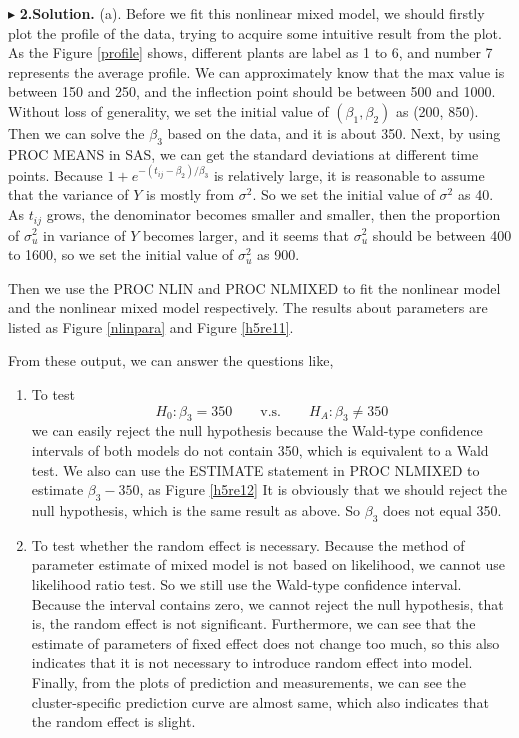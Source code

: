 \documentclass[letterpaper, 12pt]{article}
\begin{document}
$\blacktriangleright$ \textbf{2.\quad Solution.} 
(a). Before we fit this nonlinear mixed model, we should firstly plot the profile of the data, trying to acquire some intuitive result from the plot. As the Figure \ref{profile} shows, different plants are label as 1 to 6, and number 7 represents the average profile. We can approximately know that the max value is between 150 and 250, and the inflection point should be between 500 and 1000. Without loss of generality, we set the initial value of $(\beta_1,\beta_2)$ as (200, 850). Then we can solve the $\beta_3$ based on the data, and it is about 350. Next, by using PROC MEANS in SAS, we can get the standard deviations at different time points. Because $1+e^{-(t_{ij}-\beta_2)/\beta_3}$ is relatively large, it is reasonable to assume that the variance of $Y$ is mostly from $\sigma^2$. So we set the initial value of $\sigma^2$ as 40. As $t_{ij}$ grows, the denominator becomes smaller and smaller, then the proportion of $\sigma_u^2$ in variance of $Y$ becomes larger, and it seems that $\sigma_u^2$ should be between 400 to 1600, so we set the initial value of $\sigma_u^2$ as 900.


Then we use the PROC NLIN and PROC NLMIXED to fit the nonlinear model and the nonlinear mixed model respectively. The results about parameters are listed as Figure \ref{nlinpara} and Figure \ref{h5re11}.

From these output, we can answer the questions like,
\begin{enumerate}
\item To test 
$$
H_0:\beta_3=350\qquad\text{v.s.}\qquad H_A:\beta_3\not=350
$$
we can easily reject the null hypothesis because the Wald-type confidence intervals of both models do not contain 350, which is equivalent to a Wald test. 
We also can use the ESTIMATE statement in PROC NLMIXED to estimate $\beta_3-350$, as Figure \ref{h5re12}
It is obviously that we should reject the null hypothesis, which is the same result as above. So $\beta_3$ does not equal 350.
\item To test whether the random effect is necessary. Because the method of parameter estimate of mixed model is not based on likelihood, we cannot use likelihood ratio test. So we still use the Wald-type confidence interval. Because the interval contains zero, we cannot reject the null hypothesis, that is, the random effect is not significant. Furthermore, we can see that the estimate of parameters of fixed effect does not change too much, so this also indicates that it is not necessary to introduce random effect into model. Finally, from the plots of prediction and measurements, we can see the cluster-specific prediction curve are almost same, which also indicates that the random effect is slight.
\end{enumerate}
\end{document}
